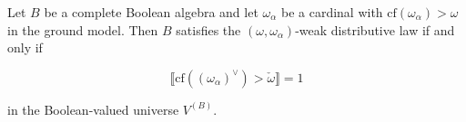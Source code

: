 Let $B$ be a complete Boolean algebra and let $\omega_{\alpha}$ be a cardinal with $\mathrm{cf}(\omega_{\alpha}) > \omega$ in the ground model. Then $B$ satisfies the $(\omega, \omega_{\alpha})$-weak distributive law if and only if

$$\llbracket \mathrm{cf}((\omega_{\alpha})^{\vee}) > \check{\omega} \rrbracket = 1$$

in the Boolean-valued universe $V^{(B)}$.
